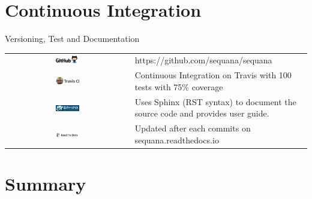 \documentclass{beamer}
\begin{document}
\section{Continuous Integration}

\begin{frame}{Versioning, Test and Documentation}
\begin{tabular}{cp{8cm}}
\vspace{0.5cm}
\includegraphics[width=0.2\textwidth,height=0.1\textheight]{../../images/logo_github.png}
& https://github.com/sequana/sequana\\

\vspace{0.5cm}
\includegraphics[width=0.2\textwidth]{../../images/logo_travis.png}&  
Continuous Integration on Travis with 100 tests with 75\% coverage\\

\vspace{0.5cm}
\includegraphics[width=0.2\textwidth]{../../images/logo_sphinx.png}& 
Uses Sphinx (RST syntax) to document the source 
code and provides user guide.\\

\vspace{0.5cm}
\includegraphics[width=0.2\textwidth]{../../images/logo_rtd.png}& 
Updated after each commits on sequana.readthedocs.io
\end{tabular}

\end{frame}

\section{Summary}
\end{document}

